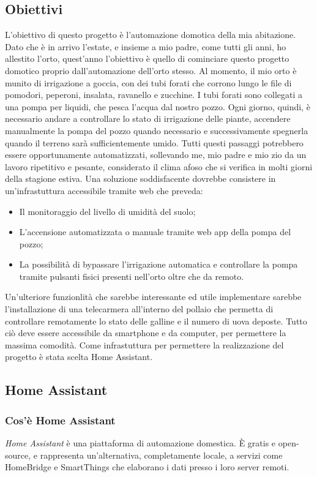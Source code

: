 \documentclass[11pt, a4paper]{article}
\begin{document}
\subsection{Obiettivi}
L'obiettivo di questo progetto è l'automazione domotica della mia abitazione.
Dato che è in arrivo l'estate, e insieme a mio padre, come tutti gli anni, ho allestito
l'orto, quest'anno l'obiettivo è quello di cominciare questo progetto domotico
proprio dall'automazione dell'orto stesso.
Al momento, il mio orto è munito di irrigazione a goccia, con dei tubi forati
che corrono lungo le file di pomodori, peperoni, insalata, ravanello e zucchine.
I tubi forati sono collegati a una pompa per liquidi, che pesca l'acqua dal nostro
pozzo. Ogni giorno, quindi, è necessario andare a controllare lo stato di irrigazione
delle piante, accendere manualmente la pompa del pozzo quando necessario e successivamente
spegnerla quando il terreno sarà sufficientemente umido.
Tutti questi passaggi potrebbero essere opportunamente automatizzati, sollevando me,
mio padre e mio zio da un lavoro ripetitivo e pesante, considerato il clima afoso
che si verifica in molti giorni della stagione estiva.
Una soluzione soddisfacente dovrebbe consistere in un'infrastuttura accessibile tramite web
che preveda:
\begin{itemize}
    \item Il monitoraggio del livello di umidità del suolo;
    \item L'accensione automatizzata o manuale tramite web app della pompa del pozzo;
    \item La possibilità di bypassare l'irrigazione automatica e controllare la pompa
            tramite pulsanti fisici presenti nell'orto oltre che da remoto.
\end{itemize}
Un'ulteriore funzionlità che sarebbe interessante ed utile implementare sarebbe l'installazione
di una telecarmera all'interno del pollaio che permetta di controllare remotamente lo stato delle galline
e il numero di uova deposte.
Tutto ciò deve essere accessibile da smartphone e da computer, per permettere la massima
comodità.
Come infrastuttura per permettere la realizzazione del progetto è stata scelta Home Assistant.

\subsection{Home Assistant}

\subsubsection{Cos'è Home Assistant}
\textit{Home Assistant} è una piattaforma di automazione domestica. È gratis e open-source, e
rappresenta un'alternativa, completamente locale, a servizi come HomeBridge e SmartThings che
elaborano i dati presso i loro server remoti.
\end{document}
